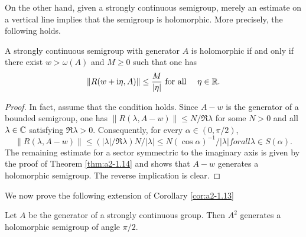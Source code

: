On the other hand, given a strongly continuous semigroup, merely an estimate on a vertical line implies that the semigroup is holomorphic.
More precisely, the following holds.
\begin{corollary*}\label{cor:a2-1.14-kgk}
A strongly continuous semigroup with generator $A$ is holomorphic if and only if there exist $w > \omega(A)$ and $M \geq 0$ such that one has
\[
    \|R(w+\mathrm{i}\eta,A)\| \leq \frac{M}{|\eta|} \text{ for all } \quad \eta \in \mathbb{R}.
\]
\end{corollary*}

\begin{proof}
In fact, assume that the condition holds.
Since $A-w$ is the generator of a bounded semigroup, one has 
$\|R(\lambda,A-w)\| \leq N/\Re\lambda$ for some $N > 0$ and all $\lambda \in \mathbb{C}$ 
satisfying $\Re\lambda > 0$.
Consequently, for every $\alpha \in (0,\pi/2)$, 
\[
\|R(\lambda,A-w)\| \leq (|\lambda|/\Re\lambda)N/|\lambda| \leq N(\cos\alpha)^{-1}/|\lambda| for all \lambda \in S(\alpha) .
\]
The remaining estimate for a sector symmectric to the imaginary axis is given by the proof of Theorem \ref{thm:a2-1.14}    
and shows that $A-w$ generates a holomorphic semigroup.
The reverse implication is clear.
\end{proof}

We now prove the following extension of Corollary \ref{cor:a2-1.13}  

\begin{theorem}\label{thm:a2-1.15}
Let $A$ be the generator of a strongly continuous group.
Then $A^2$ generates a holomorphic semigroup of angle $\pi/2$.
\end{theorem}

